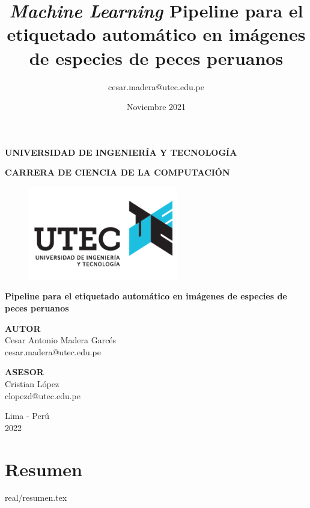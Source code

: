 \documentclass{report}
\title{\textit{Machine Learning} Pipeline para el etiquetado 
automático en imágenes de especies 
de peces peruanos}
\author{cesar.madera@utec.edu.pe}
\date{Noviembre 2021}
\begin{document}
\begin{titlepage}
    \begin{center}
        \Large
        \textbf{UNIVERSIDAD DE INGENIERÍA Y TECNOLOGÍA}
        \vspace*{1cm}

        \large
        \textbf{CARRERA DE CIENCIA DE LA COMPUTACIÓN}
        \vspace*{1cm}

        \begin{figure}[htbp]
            \centering
            \includegraphics[width=6.5cm,height=\textheight,keepaspectratio]{images/logo}
        \end{figure}


        \LARGE
        \textbf{Pipeline para el etiquetado 
            automático en imágenes de especies 
            de peces peruanos}

        \vspace{1.0cm}
        \Large


        \textbf{AUTOR}
        \vspace{0.5cm}
        \\Cesar Antonio Madera Garcés
        \\cesar.madera@utec.edu.pe

        \textbf{ASESOR}
        \vspace{0.5cm}
        \\Cristian López
        \\clopezd@utec.edu.pe
        \vfill
        \Large

        Lima - Perú
        \\
        2022

    \end{center}
\end{titlepage}


\chapter*{Resumen}
{real/resumen.tex}
\end{document}
